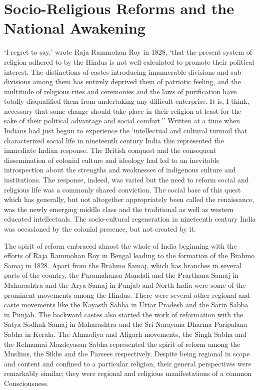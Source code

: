 \cleardoublepage
\chapter{Socio-Religious Reforms and the National Awakening}

`I regret to say,' wrote Raja Rammohan Roy in 1828, `that the present system of religion adhered to by the Hindus is not well calculated to promote their political interest. The distinctions of castes introducing innumerable divisions and sub-divisions among them has entirely deprived them of patriotic feeling, and the multitude of religious rites and ceremonies and the laws of purification have totally disqualified them from undertaking any difficult enterprise. It is, I think, necessary that some change should take place in their religion at least for the sake of their political advantage and social comfort.'' Written at a time when Indians had just begun to experience the `intellectual and cultural turmoil that characterized social life in nineteenth century India this represented the immediate Indian response. The British conquest and the consequent dissemination of colonial culture and ideology had led to an inevitable introspection about the strengths and weaknesses of indigenous culture and institutions. The response, indeed, was varied but the need to reform social and religious life was a commonly shared conviction. The social base of this quest which has generally, but not altogether appropriately been called the renaissance, was the newly emerging middle class and the traditional as well as western educated intellectuals. The socio-cultural regeneration in nineteenth century India was occasioned by the colonial presence, but not created by it.

The spirit of reform embraced almost the whole of India beginning with the efforts of Raja Rammohan Roy in Bengal leading to the formation of the Brahmo Samaj in 1828. Apart from the Brahmo Samaj, which has branches in several parts of the country, the Paramahansa Mandali and the Prarthana Samaj in Maharashtra and the Arya Samaj in Punjab and North India were some of the prominent movements among the Hindus. There were several other regional and caste movements like the Kayasth Sabha in Uttar Pradesh and the Sarin Sabba in Punjab. The backward castes also started the work of reformation with the Satya Sodhak Samaj in Maharashtra and the Sri Narayana Dharma Paripalana Sabha in Kerala. The Ahmadiya and Aligarh movements, the Singh Sabha and the Rehnumai Mazdeyasan Sabha represented the spirit of reform among the Muslims, the Sikhs and the Parsees respectively. Despite being regional in scope and content and confined to a particular religion, their general perspectives were remarkably similar; they were regional and religious manifestations of a common Consciousness.

